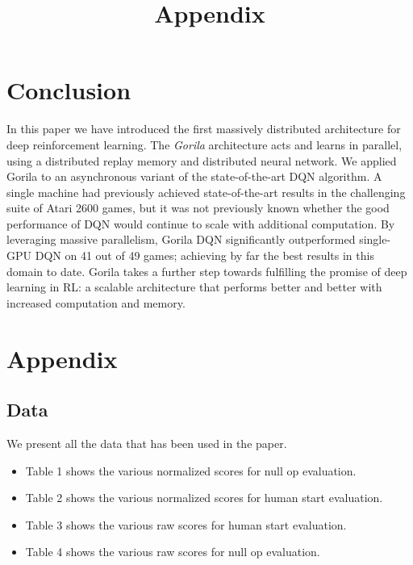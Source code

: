 \documentclass{article}
\begin{document}
 \section{Conclusion}
In this paper we have introduced the first massively distributed architecture for deep reinforcement learning. The \emph{Gorila} architecture acts and learns in parallel, using a distributed replay memory and distributed neural network. We applied Gorila to  an asynchronous variant of the state-of-the-art DQN algorithm. A single machine had previously achieved state-of-the-art results in the challenging suite of Atari 2600 games, but it was not previously known whether the good performance of DQN would continue to scale with additional computation. By leveraging massive parallelism, Gorila DQN significantly outperformed single-GPU DQN on 41 out of 49 games; achieving by far the best results in this domain to date. Gorila takes a further step towards fulfilling the promise of deep learning in RL: a scalable architecture that performs better and better with increased computation and memory.
 

\graphicspath{{figures/}}

	\title{Appendix}
	\maketitle

\section{Appendix}

\subsection{Data}
We present all the data that has been used in the paper. 
	\begin{itemize}
		\item Table 1 shows the various normalized scores for null op evaluation.
		\item Table 2 shows the various normalized scores for human start evaluation.
		\item Table 3 shows the various raw scores for human start evaluation.
		\item Table 4 shows the various raw scores for null op evaluation.
	\end{itemize}
\end{document}
